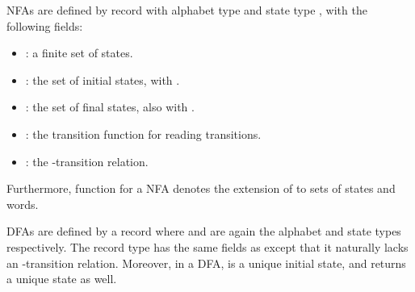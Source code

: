 \begin{isabellebody}
\begin{isamarkuptext}
NFAs are defined by record  with alphabet type  and state type 
, with the following fields:
\begin{itemize}
\item {}: a finite set of states.
\item {}: the set of initial states, with .
\item {}: the set of final states, also with .
\item {}: the transition function for reading transitions.
\item {}: the \isa{{\isasymepsilon}}-transition relation.
\end{itemize}

Furthermore, function  for a NFA denotes the extension of 
 to sets of states and words. 

DFAs are defined by a record  where  and  are again the 
alphabet and state types respectively. The  record type has the same fields as 
 except that it naturally lacks an \isa{{\isasymepsilon}}-transition relation. Moreover, in a DFA,
 is a unique initial state, and  returns a unique state as well.


\end{isamarkuptext}
\end{isabellebody}
